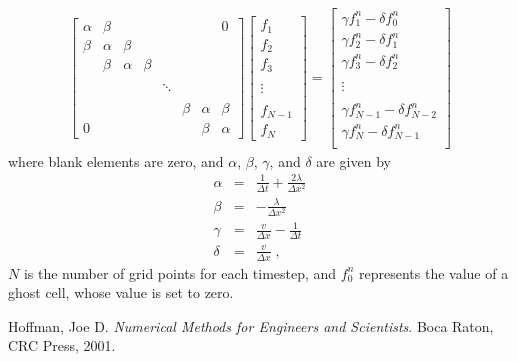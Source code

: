\documentclass[12pt,letterpaper]{article}
\begin{document}
\begin{enumerate}
\begin{itemize}
\begin{gather}
\begin{bmatrix}
\alpha & \beta &   & &  & & &  0 \\
\beta & \alpha & \beta &  & & & & \\
 & \beta & \alpha & \beta  & &  & & \\
 \\
 & & & & \ddots & & & \\
 \\
& & & & & \beta& \alpha& \beta\\
0 & & & & & & \beta& \alpha
\end{bmatrix}
\begin{bmatrix}
f_1\\
f_2\\
f_3\\
\\
\vdots \\
\\
f_{N-1}\\
f_{N}
\end{bmatrix}
=
\begin{bmatrix}
\gamma f_1^n - \delta f_{0}^n\\
\gamma f_2^n - \delta f_{1}^n\\
\gamma f_3^n - \delta f_{2}^n\\
\\
\vdots \\
\\
\gamma f_{N-1}^n - \delta f_{N-2}^n\\
\gamma f_N^n - \delta f_{N-1}^n\\
\end{bmatrix}
\end{gather}
where blank elements are zero, and $\alpha$, $\beta$, $\gamma$, and $\delta$ are given by
\begin{eqnarray*}
\alpha &=& \frac{1}{\Delta t} + \frac{2\lambda}{\Delta x^2}\\
\beta &=& -\frac{\lambda}{\Delta x^2}\\
\gamma &=& \frac{v}{\Delta x} - \frac{1}{\Delta t}\\
\delta &=& \frac{v}{\Delta x}\;,
\end{eqnarray*}
$N$ is the number of grid points for each timestep, and $f_0^n$ represents the value of a ghost cell, whose value is set to zero.
\end{itemize}
\end{enumerate}
\begin{thebibliography}{9}
Hoffman, Joe D. \textit{Numerical Methods for Engineers and Scientists}. Boca Raton, CRC Press, 2001.
\end{thebibliography}
\end{document}
